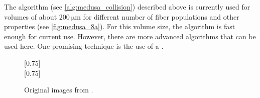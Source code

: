 %
The algorithm (see \cref{alg:medusa_collision}) described above is currently used for volumes of about $\SI{200}{\micro\meter}$ for different number of fiber populations and other properties (see \cref{fig:medusa_8a}).
For this volume size, the algorithm is fast enough for current use.
However, there are more advanced algorithms that can be used here.
One promising technique is the use of a  \cite{Karras2012}.
%
\begin{figure}[!t]
    \centering
    [0.75\textwidth]{\label{fig:medusa_8a}
    }
    \\[2em]
    [0.75\textwidth]{\label{fig:medusa_8b}
    }
	\caption{Original images from \cite{Ginsburger2019}.}
	\label{fig:medusa_8}
\end{figure}